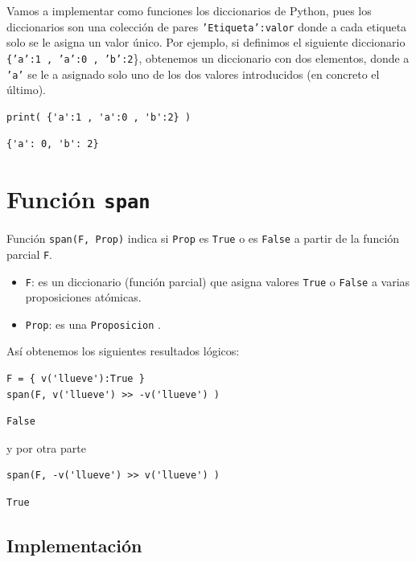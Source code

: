\documentclass[10pt,a4paper]{report}
\begin{document}
Vamos a implementar como funciones los diccionarios de Python, pues los diccionarios son una colección de pares \texttt{'Etiqueta':valor} donde a cada etiqueta solo se le asigna un valor único.
Por ejemplo, si definimos el siguiente diccionario \texttt{\{'a':1 , 'a':0 , 'b':2}\}, obtenemos un diccionario con dos elementos, donde a \texttt{'a'} se le a asignado solo uno de los dos valores introducidos (en concreto el último).
\begin{verbatim}
print( {'a':1 , 'a':0 , 'b':2} )
\end{verbatim}

\label{}
\begin{verbatim}
{'a': 0, 'b': 2}
\end{verbatim}
\section{Función \texttt{span}}
\label{sec:org3073dd3}

Función \texttt{span(F, Prop)} indica si \texttt{Prop} es \texttt{True} o es \texttt{False} a partir de la función parcial \texttt{F}.
\begin{itemize}
\item \texttt{F}: es un diccionario (función parcial) que asigna valores \texttt{True} o \texttt{False} a varias proposiciones atómicas.
\item \texttt{Prop}: es una \texttt{Proposicion} .
\end{itemize}
Así obtenemos los siguientes resultados lógicos:
\begin{verbatim}
F = { v('llueve'):True }
span(F, v('llueve') >> -v('llueve') )
\end{verbatim}

\label{}
\begin{verbatim}
False
\end{verbatim}

y por otra parte
\begin{verbatim}
span(F, -v('llueve') >> v('llueve') )
\end{verbatim}

\label{}
\begin{verbatim}
True
\end{verbatim}
\subsection{Implementación}
\label{sec:orgb63986a}
\end{document}
